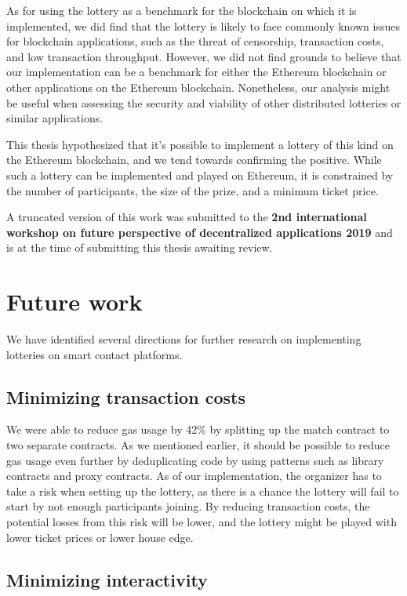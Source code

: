 As for using the lottery as a benchmark for the blockchain on which it is implemented, we did find that the lottery is likely to face commonly known issues for blockchain applications, such as the threat of censorship, transaction costs, and low transaction throughput. However, we did not find grounds to believe that our implementation can be a benchmark for either the Ethereum blockchain or other applications on the Ethereum blockchain. Nonetheless, our analysis might be useful when assessing the security and viability of other distributed lotteries or similar applications.

This thesis hypothesized that it's possible to implement a lottery of this kind on the Ethereum blockchain, and we tend towards confirming the positive. While such a lottery can be implemented and played on Ethereum, it is constrained by the number of participants, the size of the prize, and a minimum ticket price.

A truncated version of this work was submitted to the \textbf{2nd international workshop on future perspective of decentralized applications 2019} and is at the time of submitting this thesis awaiting review.

\section{Future work}
\label{sec:future-work}

We have identified several directions for further research on implementing lotteries on smart contact platforms.

\subsection{Minimizing transaction costs}

We were able to reduce gas usage by 42\% by splitting up the match contract to two separate contracts. As we mentioned earlier, it should be possible to reduce gas usage even further by deduplicating code by using patterns such as library contracts and proxy contracts. As of our implementation, the organizer has to take a risk when setting up the lottery, as there is a chance the lottery will fail to start by not enough participants joining. By reducing transaction costs, the potential losses from this risk will be lower, and the lottery might be played with lower ticket prices or lower house edge.

\subsection{Minimizing interactivity}

